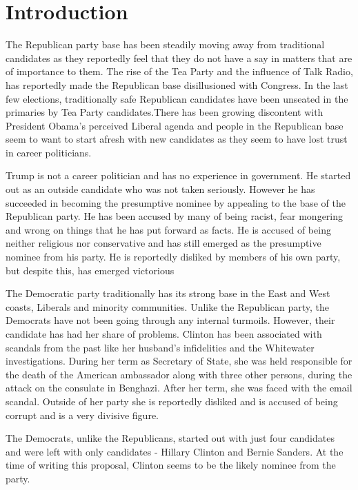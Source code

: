 \documentclass{sig-alternate-05-2015}
\begin{document}
%
%

%
%


\section{Introduction}


The Republican party base has been steadily moving away from traditional candidates as they reportedly feel that they do not have a say in matters that are of importance to them. The rise of the Tea Party and the influence of Talk Radio, has reportedly made the Republican base disillusioned with Congress. In the last few elections, traditionally safe Republican candidates have been unseated in the primaries by Tea Party candidates.There has been growing discontent with President Obama's perceived Liberal agenda and people in the Republican base seem to want to start afresh with new candidates as they seem to have lost trust in career politicians.

Trump is not a career politician and has no experience in government. He started out as an outside candidate who was not taken seriously. However he has succeeded in becoming the presumptive nominee by appealing to the base of the Republican party. He has been accused by many of being racist, fear mongering and wrong on things that he has put forward as facts. He is accused of being neither religious nor conservative and has still emerged as the presumptive nominee from his party. He is reportedly disliked by members of his own party, but despite this, has emerged victorious

The Democratic party traditionally has its strong base in the East and West coasts, Liberals and minority communities. Unlike the Republican party, the Democrats have not been going through any internal turmoils. However, their candidate has had her share of problems. Clinton has been associated with scandals from the past like her husband's infidelities and the Whitewater investigations. During her term as Secretary of State, she was held responsible for the death of the American ambassador along with three other persons, during the attack on the consulate in Benghazi. After her term, she was faced with the email scandal. Outside of her party she is reportedly disliked and is accused of being corrupt and is a very divisive figure.

The Democrats, unlike the Republicans, started out with just four candidates and were left with only candidates - Hillary Clinton and Bernie Sanders. At the time of writing this proposal, Clinton seems to be the likely nominee from the party.
\end{document}

